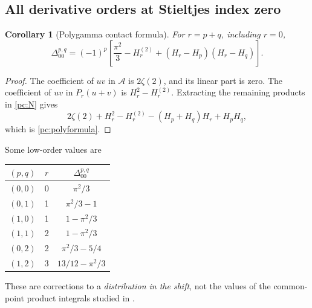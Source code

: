 \documentclass[11pt,a4paper]{article}
\numberwithin{equation}{section}
\newtheorem{corollary}[theorem]{Corollary}
\theoremstyle{definition}
\newcommand{\Af}{\mathcal A}
\begin{document}
\subsection{All derivative orders at Stieltjes index zero}
\begin{corollary}[Polygamma contact formula]\label{pc:polygamma}
For $r=p+q$, including $r=0$,
\begin{equation}\label{pc:polyformula}
 \boxed{\ \Delta_{00}^{p,q}=(-1)^p
 \left[\frac{\pi^2}{3}-H_r^{(2)}+(H_r-H_p)(H_r-H_q)\right].\ }
\end{equation}
\end{corollary}
\begin{proof}
The coefficient of $uv$ in $\Af$ is $2\zeta(2)$, and its linear part is zero. The coefficient of $uv$ in $P_r(u+v)$ is $H_r^2-H_r^{(2)}$. Extracting the remaining products in \eqref{pc:N} gives
\[
 2\zeta(2)+H_r^2-H_r^{(2)}-(H_p+H_q)H_r+H_pH_q,
\]
which is \eqref{pc:polyformula}.
\end{proof}
Some low-order values are
\begin{center}
\begin{tabular}{@{}ccc@{}}
\toprule
$(p,q)$ & $r$ & $\Delta_{00}^{p,q}$\\
\midrule
$(0,0)$&0&$\pi^2/3$\\
$(0,1)$&1&$\pi^2/3-1$\\
$(1,0)$&1&$1-\pi^2/3$\\
$(1,1)$&2&$1-\pi^2/3$\\
$(0,2)$&2&$\pi^2/3-5/4$\\
$(1,2)$&3&$13/12-\pi^2/3$\\
\bottomrule
\end{tabular}
\end{center}
These are corrections to a \emph{distribution in the shift}, not the values of the common-point product integrals studied in \cite{pc:coincident}.
\end{document}
